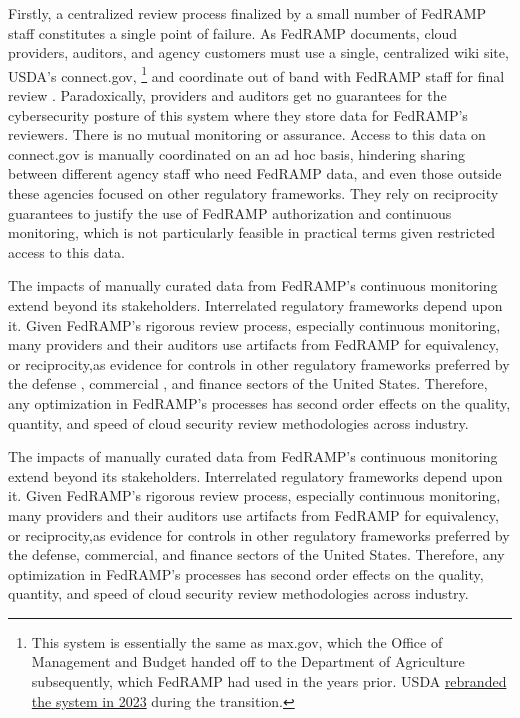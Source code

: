 \documentclass{jdf}
\begin{document}
Firstly, a centralized review process finalized by a small number of FedRAMP staff constitutes a single point of failure. As FedRAMP documents, cloud providers, auditors, and agency customers must use a single, centralized wiki site, USDA's connect.gov, \footnote{This system is essentially the same as max.gov, which the Office of Management and Budget handed off to the Department of Agriculture subsequently, which FedRAMP had used in the years prior. USDA \hyperlink{https://www.fedramp.gov/2023-11-13-usda-connect-update-to-fedramp-stakeholders/}{rebranded the system in 2023} during the transition.} and coordinate out of band with FedRAMP staff for final review \citeyear[pp.~3,14]{fedramp_auth_playbook25}. Paradoxically, providers and auditors get no guarantees for the cybersecurity posture of this system where they store data for FedRAMP's reviewers. There is no mutual monitoring or assurance. Access to this data on connect.gov is manually coordinated on an ad hoc basis, hindering sharing between different agency staff who need FedRAMP data, and even those outside these agencies focused on other regulatory frameworks. They rely on reciprocity guarantees to justify the use of FedRAMP authorization and continuous monitoring, which is not particularly feasible in practical terms given restricted access to this data.

The impacts of manually curated data from FedRAMP's continuous monitoring extend beyond its stakeholders. Interrelated regulatory frameworks depend upon it. Given FedRAMP's rigorous review process, especially continuous monitoring, many providers and their auditors use artifacts from FedRAMP for equivalency, or reciprocity,as evidence for controls in other regulatory frameworks preferred by the defense \cite{dod_fedramp_memo23}, commercial \cite{orock21}, and finance sectors of the United States. Therefore, any optimization in FedRAMP's processes has second order effects on the quality, quantity, and speed of cloud security review methodologies across industry.

The impacts of manually curated data from FedRAMP's continuous monitoring extend beyond its stakeholders. Interrelated regulatory frameworks depend upon it. Given FedRAMP's rigorous review process, especially continuous monitoring, many providers and their auditors use artifacts from FedRAMP for equivalency, or reciprocity,as evidence for controls in other regulatory frameworks preferred by the defense, commercial, and finance sectors of the United States. Therefore, any optimization in FedRAMP's processes has second order effects on the quality, quantity, and speed of cloud security review methodologies across industry.
\end{document}
